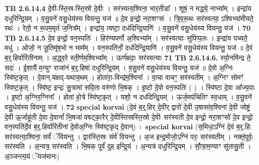\documentclass[17pt]{extarticle}
\begin{document}
                                \textbf{ TB 2.6.14.4} \newline
                  दे॒वी-स्ति॒स्र-स्ति॒स्रो दे॒वीः । सर॑स्वत्य॒श्विना॒ भार॒तीडा᳚ । शूषं॒ न मद्ध्ये॒ नाभ्या᳚म् । इन्द्रा॑य दधुरिन्द्रि॒यम् । व॒सु॒वने॑ वसु॒धेय॑स्य वियन्तु॒ यज॑ ॥ दे॒व इन्द्रो॒ नरा॒शꣳसः॑ । त्रि॒व॒रू॒थः सर॑स्वत्या॒ ऽश्विभ्या॑मीयते॒ रथः॑ । रेतो॒ न रू॒पम॒मृतं॑ ज॒नित्र᳚म् । इन्द्रा॑य॒ त्वष्टा॒ दध॑दिन्द्रि॒याणि॑ । व॒सु॒वने॑ वसु॒धेय॑स्य वियन्तु॒ यज॑ । \textbf{ 70} \newline
                  \newline
                                \textbf{ TB 2.6.14.5} \newline
                  दे॒व इन्द्रो॒ वन॒स्पतिः॑ । हिर॑ण्यपर्णो अ॒श्विभ्या᳚म् । सर॑स्वत्याः सुपिप्प॒लः । इन्द्रा॑य पच्यते॒ मधु॑ । ओजो॒ न जू॒तिमृ॑ष॒भो न भाम᳚म् । वन॒स्पति॑र्नो॒ दध॑दिन्द्रि॒याणि॑ । व॒सु॒वने॑ वसु॒धेय॑स्य वियन्तु॒ यज॑ ॥ दे॒वं ब॒र्॒.हिर्वारि॑तीनाम् । अ॒द्ध्व॒रे स्ती॒र्णम॒श्विभ्या᳚म् । ऊर्ण॑म्रदाः॒ सर॑स्वत्याः \textbf{ 71} \newline
                  \newline
                                \textbf{ TB 2.6.14.6.} \newline
                  स्यो॒नमि॑न्द्र ते॒ सदः॑ । ई॒शायै॑ म॒न्युꣳ राजा॑नं ब॒र्॒.हिषा॑ दधुरिन्द्रि॒यम् । व॒सु॒वने॑ वसु॒धेय॑स्य वियन्तु॒ यज॑ ॥ दे॒वो अ॒ग्निः स्वि॑ष्ट॒कृत् । दे॒वान्.य॑क्षद्-यथाय॒थम् । होता॑रा॒-विन्द्र॑म॒श्विना᳚ । वा॒चा वाचꣳ॒॒ सर॑स्वतीम् । अ॒ग्निꣳ सोमꣳ॑ स्विष्ट॒कृत् । स्वि॑ष्ट॒ इन्द्रः॑ सु॒त्रामा॑ सवि॒ता वरु॑णो भि॒षक् । इ॒ष्टो दे॒वो वन॒स्पतिः॑ ( ) । स्वि॑ष्टा दे॒वा आ᳚ज्य॒पाः । इ॒ष्टो अ॒ग्निर॒ग्निना᳚ । होता॑ हो॒त्रे स्वि॑ष्ट॒कृत् । यशो॒ न दध॑दिन्द्रि॒यम् । ऊर्ज॒मप॑चितिꣳ स्व॒धाम् । व॒सु॒वने॑ वसु॒धेय॑स्य वियन्तु॒ यज॑ । \textbf{ 72} \newline
                  \newline
                                                        \textbf{special korvai} \newline
              (दे॒वं ब॒र्॒.हिर् दे॒वीर् द्वारो॑ दे॒वी उ॒षासा॑व॒श्विना॑ दे॒वी जोष्ट्र॑ दे॒वी ऊ॒र्जाहू॑ती दे॒वा दे॒वानां᳚ भि॒षजा॑ वषट्का॒रैर् दे॒वीस्तिस्रस्ति॒स्रो दे॒वीः सर॑स्वती दे॒व इन्द्रो॒ नरा॒शꣳसो॑ दे॒व इन्द्रो॒ वन॒स्पति॑र्दे॒वं ब॒र्॒.हिर्वारि॑तीनां दे॒वोअ॒ग्निः स्वि॑ष्ट॒कृद् दे॒वान्) । \newline
                            \textbf{special korvai} \newline
              (स॒मिधा॒ऽग्निं दे॒वं ब॒र्॒.हिः सर॑स्वत्या॒श्विना॒ सर्वं॑ ॅवियन्तु । द्वार॑स्ति॒स्रः संर्व॑ वियन्तु । अ॒ज इन्द्र॒मोजो॒ऽग्निं परः॒ सर॑स्वतीम् । नक्तं॒पूर्वः॒ सर॑स्वति । अ॒न्यत्र॒ सर॑स्वति । भि॒षक् पूर्वं॑ दुह इन्द्रि॒यं । अ॒न्यत्र॑ दधुरिन्द्रि॒यम् । सौ॒त्रा॒म॒ण्याꣳ सु॑तासु॒ती । अ॒ञ्जन्त्य॒यं ॅयज॑मानः) \newline
\end{document}
